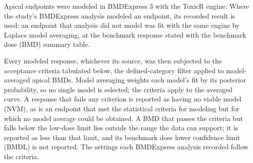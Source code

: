 Apical endpoints were modeled in BMDExpress 3 with the ToxicR engine. Where the study's BMDExpress analysis modeled an endpoint, its recorded result is used; an endpoint that analysis did not model was fit with the same engine by Laplace model averaging, at the benchmark response stated with the benchmark dose (BMD) summary table.

Every modeled response, whichever its source, was then subjected to the acceptance criteria tabulated below, the defined-category filter applied to model-averaged apical BMDs. Model averaging weights each model's fit by its posterior probability, so no single model is selected; the criteria apply to the averaged curve. A response that fails any criterion is reported as having no viable model (NVM), as is an endpoint that met the statistical criteria for modeling but for which no model average could be obtained. A BMD that passes the criteria but falls below the low-dose limit lies outside the range the data can support; it is reported as less than that limit, and its benchmark dose lower confidence limit (BMDL) is not reported. The settings each BMDExpress analysis recorded follow the criteria.

